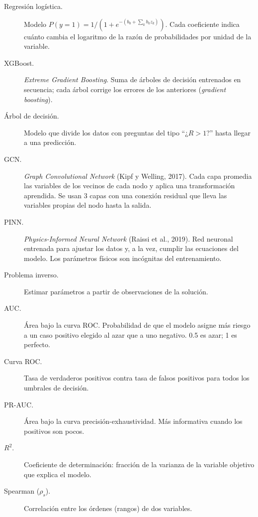 \begin{terminos}
\begin{description}
\item[Regresión logística.] Modelo $P(y=1)=1/(1+e^{-(b_0+\sum_kb_kz_k)})$. Cada
coeficiente indica cuánto cambia el logaritmo de la razón de probabilidades por unidad
de la variable.
\item[XGBoost.] \emph{Extreme Gradient Boosting}. Suma de árboles de decisión entrenados
en secuencia; cada árbol corrige los errores de los anteriores (\emph{gradient
boosting}).
\item[Árbol de decisión.] Modelo que divide los datos con preguntas del tipo ``¿$R>1$?''
hasta llegar a una predicción.
\item[GCN.] \emph{Graph Convolutional Network} (Kipf y Welling, 2017). Cada capa promedia
las variables de los vecinos de cada nodo y aplica una transformación aprendida. Se
usan 3 capas con una conexión residual que lleva las variables propias del nodo hasta
la salida.
\item[PINN.] \emph{Physics-Informed Neural Network} (Raissi et al., 2019). Red neuronal
entrenada para ajustar los datos y, a la vez, cumplir las ecuaciones del modelo. Los
parámetros físicos son incógnitas del entrenamiento.
\item[Problema inverso.] Estimar parámetros a partir de observaciones de la solución.
\item[AUC.] Área bajo la curva ROC. Probabilidad de que el modelo asigne más riesgo a un
caso positivo elegido al azar que a uno negativo. 0.5 es azar; 1 es perfecto.
\item[Curva ROC.] Tasa de verdaderos positivos contra tasa de falsos positivos para todos
los umbrales de decisión.
\item[PR-AUC.] Área bajo la curva precisión-exhaustividad. Más informativa cuando los
positivos son pocos.
\item[$R^2$.] Coeficiente de determinación: fracción de la varianza de la variable
objetivo que explica el modelo.
\item[Spearman ($\rho_s$).] Correlación entre los órdenes (rangos) de dos variables.
\end{description}
\end{terminos}
\begin{preguntas}
\end{preguntas}
